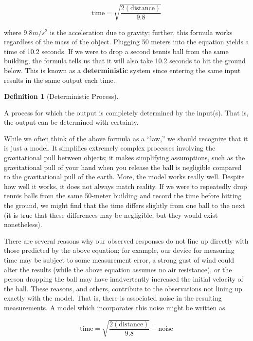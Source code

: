 \documentclass[
  letterpaper,
  DIV=11,
  numbers=noendperiod]{scrreprt}
\theoremstyle{plain}
\theoremstyle{definition}
\theoremstyle{definition}
\newtheorem{definition}{Definition}[chapter]
\theoremstyle{remark}
\begin{document}
\[\text{time} = \sqrt{\frac{2(\text{distance})}{9.8}}\]

where \(9.8 m/s^2\) is the acceleration due to gravity; further, this
formula works regardless of the mass of the object. Plugging 50 meters
into the equation yields a time of 10.2 seconds. If we were to drop a
second tennis ball from the same building, the formula tells us that it
will also take 10.2 seconds to hit the ground below. This is known as a
\textbf{deterministic} system since entering the same input results in
the same output each time.

\begin{definition}[Deterministic
Process]\protect\hypertarget{def-deterministic-process}{}\label{def-deterministic-process}

A process for which the output is completely determined by the input(s).
That is, the output can be determined with certainty.

\end{definition}

While we often think of the above formula as a ``law,'' we should
recognize that it is just a model. It simplifies extremely complex
processes involving the gravitational pull between objects; it makes
simplifying assumptions, such as the gravitational pull of your hand
when you release the ball is negligible compared to the gravitational
pull of the earth. More, the model works really well. Despite how well
it works, it does not always match reality. If we were to repeatedly
drop tennis balls from the same 50-meter building and record the time
before hitting the ground, we might find that the time differs slightly
from one ball to the next (it is true that these differences may be
negligible, but they would exist nonetheless).

There are several reasons why our observed responses do not line up
directly with those predicted by the above equation; for example, our
device for measuring time may be subject to some measurement error, a
strong gust of wind could alter the results (while the above equation
assumes no air resistance), or the person dropping the ball may have
inadvertently increased the initial velocity of the ball. These reasons,
and others, contribute to the observations not lining up exactly with
the model. That is, there is associated noise in the resulting
measurements. A model which incorporates this noise might be written as

\[\text{time} = \sqrt{\frac{2(\text{distance})}{9.8}} + \text{noise}\]
\end{document}
